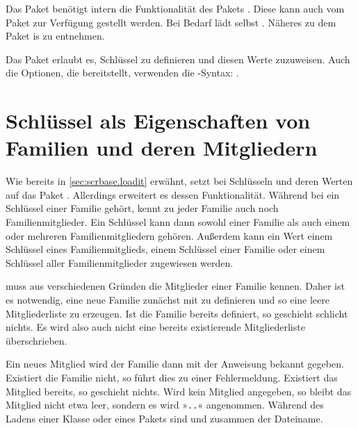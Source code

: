 Das Paket  benötigt intern die Funktionalität des Pakets
. Diese kann
auch vom Paket  zur Verfügung gestellt werden. Bei Bedarf
lädt  selbst . Näheres zu dem Paket is
\cite{package:keyval} zu entnehmen.

Das Paket  erlaubt es, Schlüssel zu definieren und diesen
Werte zuzuweisen.  Auch die Optionen, die  bereitstellt,
verwenden die -Syntax: %
.


\section{Schlüssel als Eigenschaften von Familien und deren Mitgliedern}

Wie bereits in \autoref{sec:scrbase.loadit} erwähnt, setzt 
bei Schlüsseln und deren Werten auf das Paket . Allerdings
erweitert es dessen Funktionalität. Während bei  ein Schlüssel
einer Familie gehört, kennt  zu jeder Familie auch noch
Familienmitglieder. Ein Schlüssel kann dann sowohl einer Familie als auch
einem oder mehreren Familienmitgliedern gehören. Außerdem kann ein Wert einem
Schlüssel eines Familienmitglieds, einem Schlüssel einer Familie oder einem
Schlüssel aller Familienmitglieder zugewiesen werden.

\begin{Declaration}
\end{Declaration}
 muss aus verschiedenen Gründen die Mitglieder einer Familie
kennen. Daher ist es notwendig, eine neue Familie zunächst mit
 zu definieren und so eine leere Mitgliederliste zu
erzeugen. Ist die Familie bereits definiert, so geschieht schlicht nichts. Es
wird also auch nicht eine bereits existierende Mitgliederliste überschrieben.

Ein neues Mitglied wird der Familie dann mit der Anweisung
 bekannt gegeben. Existiert die Familie nicht, so
führt dies zu einer Fehlermeldung. Existiert das Mitglied bereits, so
geschieht nichts. Wird kein Mitglied angegeben, so bleibt das Mitglied nicht
etwa leer, sondern es wird
»\texttt{.}\texttt{.}« angenommen. Während
des Ladens einer Klasse oder eines Pakets sind  und
 zusammen der Dateiname.

